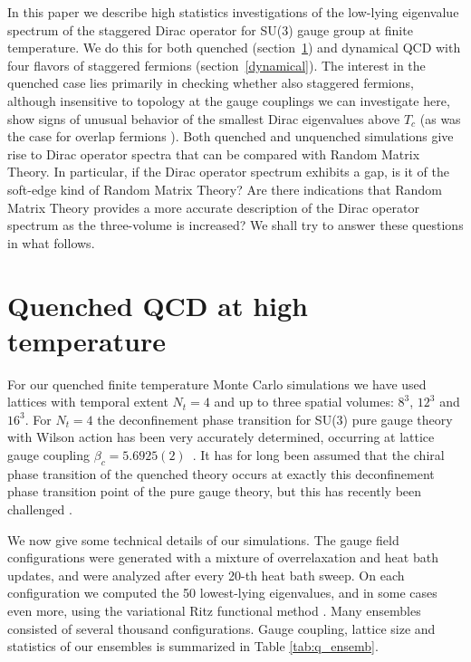 \documentclass[11pt]{article}
\newcommand{\noi}{\vspace{12pt}\noindent}
\begin{document}
\noi
In this paper we describe high statistics investigations of the low-lying
eigenvalue spectrum of the staggered Dirac operator for SU(3) gauge group
at finite
temperature. We do this for both quenched (section~\ref{quenched}) and
dynamical QCD with four flavors of staggered fermions
(section~\ref{dynamical}). The interest in the quenched case lies primarily
in checking whether also staggered fermions, although insensitive to
topology at the gauge couplings we can investigate here, show signs of
unusual behavior of the smallest Dirac eigenvalues above $T_c$ (as was the
case for overlap fermions \cite{EHKN_fT}). Both
quenched and unquenched simulations give rise to Dirac operator spectra
that can be compared with Random Matrix Theory. In particular, if the
Dirac operator spectrum exhibits a gap, is it of the soft-edge kind of
Random Matrix Theory? Are there indications that Random Matrix Theory
provides a more accurate description of the Dirac operator spectrum
as the three-volume is increased? We shall try to answer these questions
in what follows.

\section {Quenched QCD at high temperature}
\label{quenched}

For our quenched finite temperature Monte Carlo
simulations we have used lattices
with temporal extent $N_t=4$ and up to three spatial volumes: $8^3$,
$12^3$ and $16^3$.  For $N_t=4$ the deconfinement phase transition for
SU(3) pure gauge theory with Wilson action
has been very accurately determined,
occurring at lattice gauge coupling $\beta_c=5.6925(2)$~\cite{T_c}.
It has for long been assumed that the chiral phase transition of the
quenched theory occurs at exactly this deconfinement phase transition
point of the pure gauge theory, but this has recently been challenged 
\cite{EHKN_fT}.

\noi
We now give some technical details of our simulations.
The gauge field configurations were generated with a mixture of
overrelaxation and heat bath updates, and were analyzed after every
20-th heat bath sweep. On each configuration we computed the 50
lowest-lying eigenvalues, and in some cases even more, using the variational
Ritz functional method \cite{Ritz}. Many ensembles consisted of several
thousand configurations. Gauge coupling, lattice size and statistics
of our ensembles is summarized in Table \ref{tab:q_ensemb}.
\end{document}
